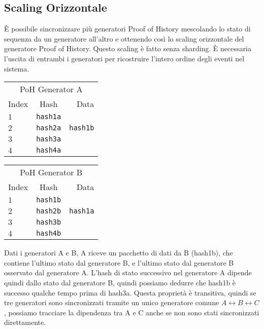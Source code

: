 \documentclass[12pt]{article}
\begin{document}
\subsection{Scaling Orizzontale}\label{poh:scale}
È possibile sincronizzare più generatori Proof of History mescolando lo stato di sequenza da un generatore all'altro e ottenendo così lo scaling orizzontale del generatore Proof of History. Questo scaling è fatto senza sharding. È necessaria l'uscita di entrambi i generatori  per ricostruire l'intero ordine degli eventi nel sistema.

\begin{center}
  \begin{tabular}{|l c r|}

  \hline
    \multicolumn{3}{|c|}{PoH Generator A} \\
    Index & Hash & Data \\ \hline
    $1$ & \texttt{hash1a} & \\
    $2$ & \texttt{hash2a} & \texttt{hash1b} \\
    $3$ & \texttt{hash3a} & \\
    $4$ & \texttt{hash4a} & \\
    \hline
    \end{tabular}
  \begin{tabular}{| l  c  r |}
  \hline
    \multicolumn{3}{|c|}{PoH Generator B} \\
    Index & Hash & Data \\ \hline
    $1$ & \texttt{hash1b} & \\
    $2$ & \texttt{hash2b} & \texttt{hash1a} \\
    $3$ & \texttt{hash3b} & \\
    $4$ & \texttt{hash4b} & \\
    \hline
    \end{tabular}
\end{center}

Dati i generatori A e B, A riceve un pacchetto di dati da B (hash1b), che contiene l'ultimo stato dal generatore B, e l'ultimo stato dal generatore B osservato dal generatore A. L'hash di stato successivo nel generatore A dipende quindi dallo stato dal generatore B, quindi possiamo dedurre che hash1b è successo qualche tempo prima di hash3a. Questa proprietà è transitiva, quindi se tre generatori sono sincronizzati tramite un unico generatore comune \(A \leftrightarrow B \leftrightarrow C\), possiamo tracciare la dipendenza tra A e C anche se non sono stati sincronizzati direttamente.
\end{document}
